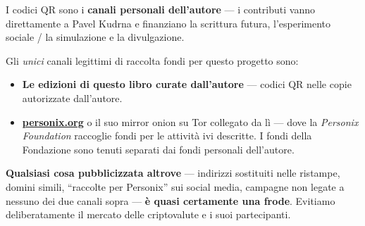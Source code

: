 \begin{minipage}[t]{0.60\textwidth}
\vspace{0pt}
\begin{mdframed}[
  linewidth=0.7pt,roundcorner=5pt,
  innerleftmargin=10pt,innerrightmargin=10pt,
  innertopmargin=8pt,innerbottommargin=8pt,
  skipabove=0pt,skipbelow=0pt,
  linecolor=cbwarning!50,backgroundcolor=cbwarning!5,
  nobreak=true,
  needspace=4\baselineskip,
]
\footnotesize
I codici QR sono i \textbf{canali personali dell'autore} --- i contributi vanno direttamente a Pavel Kudrna e finanziano la scrittura futura, l'esperimento sociale / la simulazione e la divulgazione.

\smallskip
Gli \emph{unici} canali legittimi di raccolta fondi per questo progetto sono:

\smallskip
\begin{itemize}
\setlength{\itemsep}{0pt}
\setlength{\topsep}{0pt}
\item \textbf{Le edizioni di questo libro curate dall'autore} --- codici QR nelle copie autorizzate dall'autore.
\item \href{https://personix.org}{\textbf{personix.org}} o il suo mirror onion su Tor collegato da lì --- dove la \emph{Personix Foundation} raccoglie fondi per le attività ivi descritte. I fondi della Fondazione sono tenuti separati dai fondi personali dell'autore.
\end{itemize}

\smallskip
\textbf{Qualsiasi cosa pubblicizzata altrove} --- indirizzi sostituiti nelle ristampe, domini simili, ``raccolte per Personix'' sui social media, campagne non legate a nessuno dei due canali sopra --- \textbf{è quasi certamente una frode}. Evitiamo deliberatamente il mercato delle criptovalute e i suoi partecipanti.
\end{mdframed}
\end{minipage}

\clearpage
